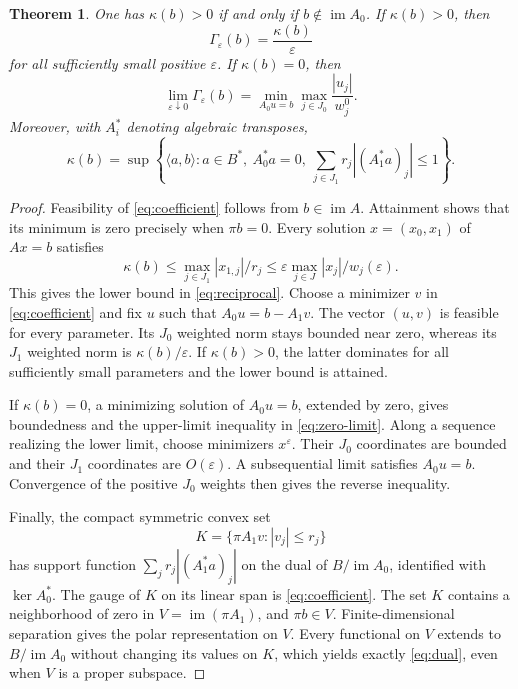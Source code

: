 \documentclass[11pt,a4paper]{article}
\numberwithin{equation}{section}
\newtheorem{theorem}{Theorem}[section]
\theoremstyle{remark}
\newcommand{\im}{\operatorname{im}}
\begin{document}
\begin{theorem}\label{thm:reciprocal}
One has $\kappa(b)>0$ if and only if $b\notin\im A_0$. If $\kappa(b)>0$, then
\begin{equation}\label{eq:reciprocal}
 \Gamma_\varepsilon(b)=\frac{\kappa(b)}{\varepsilon}
\end{equation}
for all sufficiently small positive $\varepsilon$. If $\kappa(b)=0$, then
\begin{equation}\label{eq:zero-limit}
 \lim_{\varepsilon\downarrow0}\Gamma_\varepsilon(b)
 =\min_{A_0u=b}\max_{j\in J_0}\frac{|u_j|}{w_j^0}.
\end{equation}
Moreover, with $A_i^*$ denoting algebraic transposes,
\begin{equation}\label{eq:dual}
 \kappa(b)=\sup\left\{\langle a,b\rangle:a\in B^*,\ A_0^*a=0,
 \ \sum_{j\in J_1}r_j|(A_1^*a)_j|\le1\right\}.
\end{equation}
\end{theorem}
\begin{proof}
Feasibility of \eqref{eq:coefficient} follows from $b\in\im A$. Attainment shows that its minimum is zero precisely when $\pi b=0$. Every solution $x=(x_0,x_1)$ of $Ax=b$ satisfies
\[
 \kappa(b)\le\max_{j\in J_1}|x_{1,j}|/r_j
 \le\varepsilon\max_{j\in J}|x_j|/w_j(\varepsilon).
\]
This gives the lower bound in \eqref{eq:reciprocal}. Choose a minimizer $v$ in \eqref{eq:coefficient} and fix $u$ such that $A_0u=b-A_1v$. The vector $(u,v)$ is feasible for every parameter. Its $J_0$ weighted norm stays bounded near zero, whereas its $J_1$ weighted norm is $\kappa(b)/\varepsilon$. If $\kappa(b)>0$, the latter dominates for all sufficiently small parameters and the lower bound is attained.

If $\kappa(b)=0$, a minimizing solution of $A_0u=b$, extended by zero, gives boundedness and the upper-limit inequality in \eqref{eq:zero-limit}. Along a sequence realizing the lower limit, choose minimizers $x^\varepsilon$. Their $J_0$ coordinates are bounded and their $J_1$ coordinates are $O(\varepsilon)$. A subsequential limit satisfies $A_0u=b$. Convergence of the positive $J_0$ weights then gives the reverse inequality.

Finally, the compact symmetric convex set
\[
 K=\{\pi A_1v:|v_j|\le r_j\}
\]
has support function $\sum_j r_j|(A_1^*a)_j|$ on the dual of $B/\im A_0$, identified with $\ker A_0^*$. The gauge of $K$ on its linear span is \eqref{eq:coefficient}. The set $K$ contains a neighborhood of zero in $V=\im(\pi A_1)$, and $\pi b\in V$. Finite-dimensional separation gives the polar representation on $V$. Every functional on $V$ extends to $B/\im A_0$ without changing its values on $K$, which yields exactly \eqref{eq:dual}, even when $V$ is a proper subspace.
\end{proof}
\end{document}

